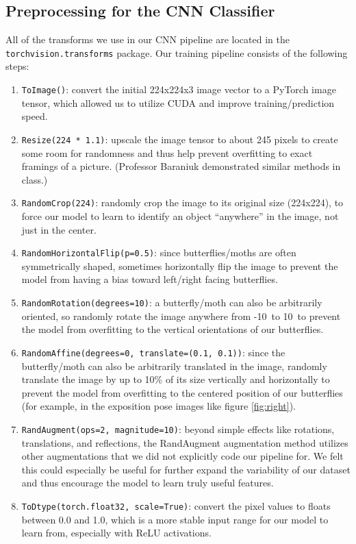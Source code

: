 \documentclass[10pt]{article} %
\begin{document}
\subsection{Preprocessing for the CNN Classifier} \label{sec:cnn_preprocessing}
All of the transforms we use in our CNN pipeline are located in the \texttt{torchvision.transforms} package. Our training pipeline consists of the following steps:
\begin{enumerate}
  \item \texttt{ToImage()}: convert the initial 224x224x3 image vector to a PyTorch image tensor, which allowed us to utilize CUDA and improve training/prediction speed.
  \item \texttt{Resize(224 * 1.1)}: upscale the image tensor to about 245 pixels to create some room for randomness and thus help prevent overfitting to exact framings of a picture. (Professor Baraniuk demonstrated similar methods in class.)
  \item \texttt{RandomCrop(224)}: randomly crop the image to its original size (224x224), to force our model to learn to identify an object ``anywhere'' in the image, not just in the center.
  \item \texttt{RandomHorizontalFlip(p=0.5)}: since butterflies/moths are often symmetrically shaped, sometimes horizontally flip the image to prevent the model from having a bias toward left/right facing butterflies.
  \item \texttt{RandomRotation(degrees=10)}: a butterfly/moth can also be arbitrarily oriented, so randomly rotate the image anywhere from -10\degree \ to 10\degree \  to prevent the model from overfitting to the vertical orientations of our butterflies.
  \item \texttt{RandomAffine(degrees=0, translate=(0.1, 0.1))}: since the butterfly/moth can also be arbitrarily translated in the image, randomly translate the image by up to 10\% of its size vertically and horizontally to prevent the model from overfitting to the centered position of our butterflies (for example, in the exposition pose images like figure \ref{fig:right}).
  \item \texttt{RandAugment(ops=2, magnitude=10)}: beyond simple effects like rotations, translations, and reflections, the RandAugment augmentation method utilizes other augmentations that we did not explicitly code our pipeline for. We felt this could especially be useful for further expand the variability of our dataset and thus encourage the model to learn truly useful features.
  \item \texttt{ToDtype(torch.float32, scale=True)}: convert the pixel values to floats between 0.0 and 1.0, which is a more stable input range for our model to learn from, especially with ReLU activations.

\end{enumerate}
\end{document}
